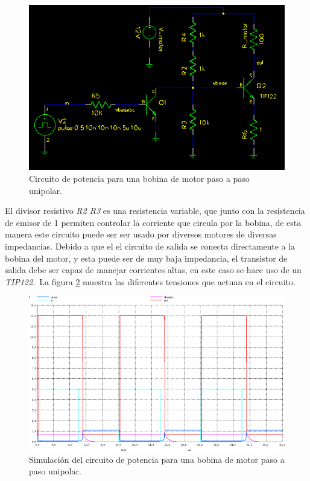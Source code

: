 \begin{figure}[htp]
\centering
\includegraphics[scale=0.7]{./img/cir_single_coil.png}
\caption{Circuito de potencia para una bobina de motor paso a paso unipolar.}
\label{fig:cir_single_coil}
\end{figure}

El divisor resistivo \emph{R2 R3} es una resistencia variable, que junto con
la resistencia de emisor de 1 \ohm  permiten controlar la corriente que circula
por la bobina, de esta manera este circuito puede ser ser usado por diversos
motores de diversas impedancias. Debido a que el el circuito de salida se
conecta directamente a la bobina del motor, y esta puede ser de muy baja
impedancia, el transistor de salida debe ser capaz de manejar corrientes altas,
en este caso se hace uso de un \emph{TIP122}.\
La figura \ref{fig:cir_single_coil_plot} muestra las diferentes tensiones que
actuan en el circuito. 

\begin{figure}[htp]
\centering
\includegraphics[width=15cm]{./img/cir_single_coil_plot.png}
\caption{Simulaci\'on del circuito de potencia para una bobina de motor paso a
paso unipolar.}
\label{fig:cir_single_coil_plot}
\end{figure}

